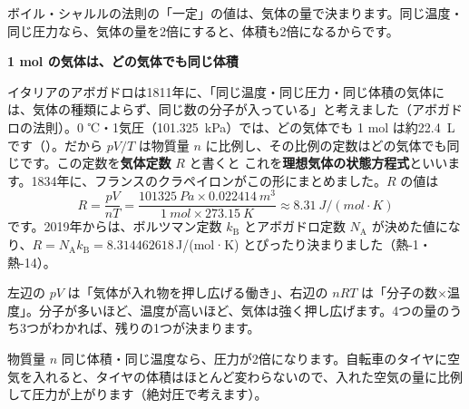 
\leavevmode\label{ph:熱-3:sec3}ボイル・シャルルの法則の「一定」の値は、気体の量で決まります。同じ温度・同じ圧力なら、気体の量を2倍にすると、体積も2倍になるからです。

\noindent\textbf{1 mol の気体は、どの気体でも同じ体積}\par\nobreak
イタリアのアボガドロは1811年に、「同じ温度・同じ圧力・同じ体積の気体には、気体の種類によらず、同じ数の分子が入っている」と考えました（アボガドロの法則）。0 ℃・1気圧（\qty{101.325}{kPa}）では、どの気体でも 1 mol は約\qty{22.4}{L}です（）。だから $pV/T$ は物質量 $n$ に比例し、その比例の定数はどの気体でも同じです。この定数を\textbf{気体定数} $R$ と書くと
\label{ph:熱-3:joutai}これを\textbf{理想気体の状態方程式}といいます。1834年に、フランスのクラペイロンがこの形にまとめました。$R$ の値は
\[ R=\frac{pV}{nT}=\frac{\qty{101325}{Pa}\times\qty{0.022414}{m^3}}{\qty{1}{mol}\times\qty{273.15}{K}}\approx\qty{8.31}{J/(mol·K)} \]
です。2019年からは、ボルツマン定数 $k_{\mathrm B}$ とアボガドロ定数 $N_{\mathrm A}$ が決めた値になり、$R=N_{\mathrm A}k_{\mathrm B}=8.314462618$\,J/(mol·K) とぴったり決まりました（熱-1・熱-14）。

\begin{phyomi}[$pV=nRT$]
左辺の $pV$ は「気体が入れ物を押し広げる働き」、右辺の $nRT$ は「分子の数×温度」。分子が多いほど、温度が高いほど、気体は強く押し広げます。4つの量のうち3つがわかれば、残りの1つが決まります。
\end{phyomi}
\begin{phbaisuru}{物質量 $n$}
同じ体積・同じ温度なら、圧力が2倍になります。自転車のタイヤに空気を入れると、タイヤの体積はほとんど変わらないので、入れた空気の量に比例して圧力が上がります（絶対圧で考えます）。
\end{phbaisuru}

